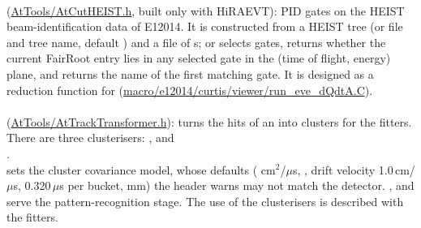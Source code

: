 \paragraph{} (\url{AtTools/AtCutHEIST.h}, built only with HiRAEVT): PID gates on the HEIST
beam-identification data of E12014. It is constructed from a HEIST tree (or file and tree name, default
) and a file of s;  or  selects gates,
 returns whether the current FairRoot entry lies in any selected gate in the (time of flight, energy)
plane, and  returns the name of the first matching gate. It is designed as a reduction function for
 (\url{macro/e12014/curtis/viewer/run_eve_dQdtA.C}).

\paragraph{} (\url{AtTools/AtTrackTransformer.h}): turns the hits of an  into
clusters for the fitters. There are three clusterisers: ,
 and\\
.\\
 sets the cluster covariance model, whose defaults ( cm$^2$/$\mu$s, , drift velocity
1.0\,cm/$\mu$s, 0.320\,$\mu$s per bucket,  mm) the header warns may not match the detector.
,  and  serve the pattern-recognition stage. The use of the
clusterisers is described with the fitters.

